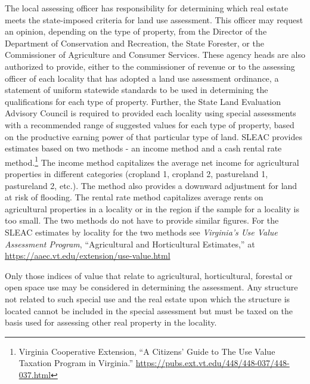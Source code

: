 \documentclass[
]{book}
\begin{document}
The local assessing officer has responsibility for determining which real estate meets the state-imposed criteria for land use assessment. This officer may request an opinion, depending on the type of property, from the Director of the Department of Conservation and Recreation, the State Forester, or the Commissioner of Agriculture and Consumer Services. These agency heads are also authorized to provide, either to the commissioner of revenue or to the assessing officer of each locality that has adopted a land use assessment ordinance, a statement of uniform statewide standards to be used in determining the qualifications for each type of property. Further, the State Land Evaluation Advisory Council is required to provided each locality using special assessments with a recommended range of suggested values for each type of property, based on the productive earning power of that particular type of land. SLEAC provides estimates based on two methods - an income method and a cash rental rate method.\footnote{Virginia Cooperative Extension, ``A Citizens' Guide to The Use Value Taxation Program in Virginia.'' \url{https://pubs.ext.vt.edu/448/448-037/448-037.html}} The income method capitalizes the average net income for agricultural properties in different categories (cropland 1, cropland 2, pastureland 1, pastureland 2, etc.). The method also provides a downward adjustment for land at risk of flooding. The rental rate method capitalizes average rents on agricultural properties in a locality or in the region if the sample for a locality is too small. The two methods do not have to provide similar figures. For the SLEAC estimates by locality for the two methods see \emph{Virginia's Use Value Assessment Program}, ``Agricultural and Horticultural Estimates,'' at \url{https://aaec.vt.edu/extension/use-value.html}

Only those indices of value that relate to agricultural, horticultural, forestal or open space use may be considered in determining the assessment. Any structure not related to such special use and the real estate upon which the structure is located cannot be included in the special assessment but must be taxed on the basis used for assessing other real property in the locality.
\end{document}
